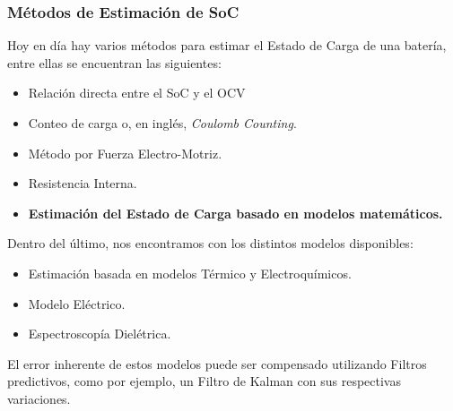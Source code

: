 \documentclass[10pt]{beamer}
\theoremstyle{remark}
\theoremstyle{definition}
\begin{document}
\begin{frame}[allowframebreaks]
  \frametitle{Métodos de Estimación de SoC}

  Hoy en día hay varios métodos para estimar el Estado de Carga de una batería,
  entre ellas se encuentran las siguientes:
  \begin{itemize}
	\item Relación directa entre el SoC y el OCV
	\item Conteo de carga o, en inglés, \emph{Coulomb Counting}.
	\item Método por Fuerza Electro-Motriz.
	\item Resistencia Interna.
	\item \textbf{Estimación del Estado de Carga basado en modelos matemáticos.}
  \end{itemize}

  \framebreak

  Dentro del último, nos encontramos con los distintos modelos disponibles:

  \begin{itemize}
	\item Estimación basada en modelos Térmico y Electroquímicos.
	\item Modelo Eléctrico.
	\item Espectroscopía Dielétrica.
  \end{itemize}

  El error inherente de estos modelos puede ser compensado utilizando Filtros
  predictivos, como por ejemplo, un Filtro de Kalman con sus respectivas
  variaciones.

\end{frame}
\end{document}
